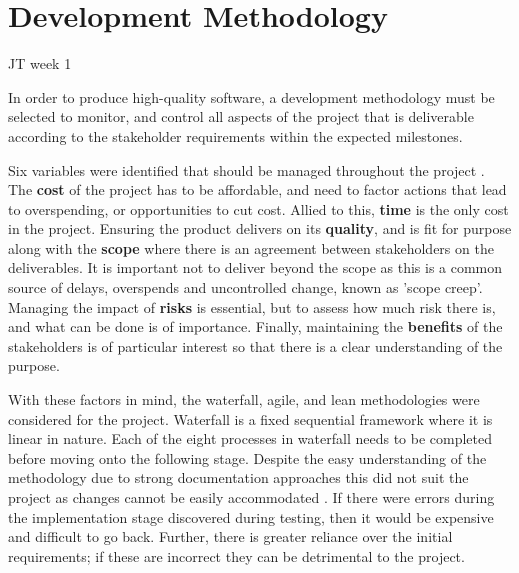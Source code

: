 
\section{Development Methodology}
JT week 1

In order to produce high-quality software, a development methodology must be selected to monitor, and control all aspects of the project that is deliverable according to the stakeholder requirements within the expected milestones. 

Six variables were identified that should be managed throughout the project \cite{prince2}. The \textbf{cost} of the project has to be affordable, and need to factor actions that lead to overspending, or opportunities to cut cost. Allied to this, \textbf{time} is the only cost in the project. Ensuring the product delivers on its \textbf{quality}, and is fit for purpose along with the \textbf{scope} where there is an agreement between stakeholders on the deliverables. It is important not to deliver beyond the scope as this is a common source of delays, overspends and uncontrolled change, known as 'scope creep'. Managing the impact of \textbf{risks} is essential, but to assess how much risk there is, and what can be done is of importance. Finally, maintaining the \textbf{benefits} of the stakeholders is of particular interest so that there is a clear understanding of the purpose.

With these factors in mind, the waterfall, agile, and lean methodologies were considered for the project. Waterfall is a fixed sequential framework where it is linear in nature. Each of the eight processes in waterfall needs to be completed before moving onto the following stage. Despite the easy understanding of the methodology due to strong documentation approaches 
this did not suit the project as changes cannot be easily accommodated \cite{smartsheet}. If there were errors during the implementation stage discovered during testing, then it would be expensive and difficult to go back. Further, there is greater reliance over the initial requirements; if these are incorrect they can be detrimental to the project. 

